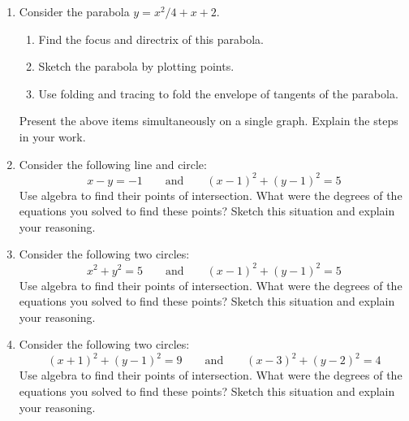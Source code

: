 \begin{problems}
\begin{enumerate}
\item Consider the parabola $y = x^2/4  + x + 2$. 
\begin{enumerate}
\item Find the focus and directrix of this parabola.
\item Sketch the parabola by plotting points. 
\item Use folding and tracing to fold the envelope of tangents of the parabola.
\end{enumerate}
Present the above items simultaneously on a single graph. Explain the
steps in your work.

\item Consider the following line and circle:
\[
x - y = -1\qquad\text{and}\qquad (x-1)^2 + (y-1)^2 = 5 
\]
Use algebra to find their points of intersection. What were the
degrees of the equations you solved to find these points? Sketch this
situation and explain your reasoning.

\item Consider the following two circles:
\[
x^2 + y^2 = 5\qquad \text{and}\qquad (x-1)^2 + (y-1)^2 = 5
\]
Use algebra to find their points of intersection. What were the
degrees of the equations you solved to find these points? Sketch this situation and explain your
reasoning.

\item Consider the following two circles:
\[
(x+1)^2 + (y-1)^2 = 9\qquad \text{and}\qquad (x-3)^2 + (y-2)^2 = 4
\]
Use algebra to find their points of intersection. What were the
degrees of the equations you solved to find these points? Sketch this
situation and explain your reasoning.


\end{enumerate}
\end{problems}

